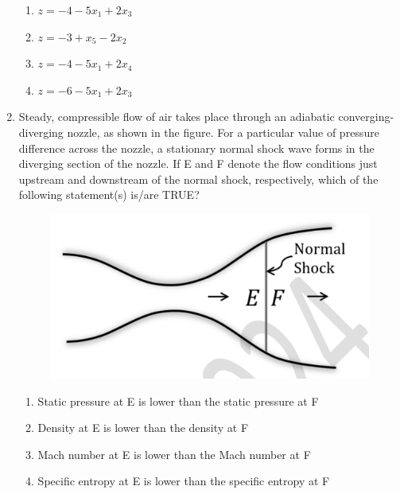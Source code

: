 \documentclass[journal,11pt,onecolumn]{IEEEtran}
\begin{document}
\begin{enumerate}[resume]
          \begin{enumerate}
              \item $z = -4 - 5x_1 + 2x_3$
              \item $z = -3 + x_5 - 2x_2$
              \item $z = -4 - 5x_1 + 2x_4$
              \item $z = -6 - 5x_1 + 2x_3$
          \end{enumerate}

    \item Steady, compressible flow of air takes place through an adiabatic converging-diverging nozzle, as shown in the figure. For a particular value of pressure difference across the nozzle, a stationary normal shock wave forms in the diverging section of the nozzle. If E and F denote the flow conditions just upstream and downstream of the normal shock, respectively, which of the following statement(s) is/are TRUE?

          \begin{figure}[H]
              \centering
              \caption{}
              \includegraphics[scale=0.2]{q40}
              \label{fig:q40}
          \end{figure}

          \begin{enumerate}
              \item Static pressure at E is lower than the static pressure at F
              \item Density at E is lower than the density at F
              \item Mach number at E is lower than the Mach number at F
              \item Specific entropy at E is lower than the specific entropy at F
          \end{enumerate}


\end{enumerate}
\end{document}
